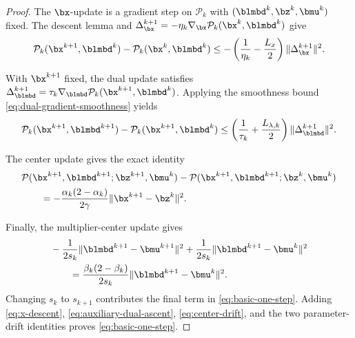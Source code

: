 \begin{proof}
The \(\bx\)-update is a gradient step on \(\mathcal P_k\) with
\((\blmbd^k,\bz^k,\bmu^k)\) fixed.  The descent lemma and
\(\Delta_{\bx}^{k+1}=-\eta_k\nabla_{\bx}\mathcal P_k(\bx^k,\blmbd^k)\)
give
\begin{equation}
    \mathcal P_k(\bx^{k+1},\blmbd^k)
    -\mathcal P_k(\bx^k,\blmbd^k)
    \le
    -\left(\frac{1}{\eta_k}-\frac{L_x}{2}\right)
    \|\Delta_{\bx}^{k+1}\|^2.
    \label{eq:x-descent}
\end{equation}

With \(\bx^{k+1}\) fixed, the dual update satisfies
\(\Delta_{\blmbd}^{k+1}=\tau_k
\nabla_{\blmbd}\mathcal P_k(\bx^{k+1},\blmbd^k)\).  Applying the smoothness
bound \eqref{eq:dual-gradient-smoothness} yields
\begin{equation}
    \mathcal P_k(\bx^{k+1},\blmbd^{k+1})
    -\mathcal P_k(\bx^{k+1},\blmbd^k)
    \le
    \left(\frac{1}{\tau_k}+\frac{L_{\lambda,k}}{2}\right)
    \|\Delta_{\blmbd}^{k+1}\|^2.
    \label{eq:auxiliary-dual-ascent}
\end{equation}

The center update gives the exact identity
\begin{equation}
\begin{aligned}
    &\mathcal P(\bx^{k+1},\blmbd^{k+1};\bz^{k+1},\bmu^k)
    -\mathcal P(\bx^{k+1},\blmbd^{k+1};\bz^k,\bmu^k) \\
    &\qquad=
    -\frac{\alpha_k(2-\alpha_k)}{2\gamma}
    \|\bx^{k+1}-\bz^k\|^2.
\end{aligned}
\label{eq:center-drift}
\end{equation}

Finally, the multiplier-center update gives
\begin{equation}
\begin{aligned}
    &-\frac{1}{2s_k}\|\blmbd^{k+1}-\bmu^{k+1}\|^2
    +\frac{1}{2s_k}\|\blmbd^{k+1}-\bmu^k\|^2 \\
    &\qquad=
    \frac{\beta_k(2-\beta_k)}{2s_k}
    \|\blmbd^{k+1}-\bmu^k\|^2.
\end{aligned}
\label{eq:mu-drift}
\end{equation}
Changing \(s_k\) to \(s_{k+1}\) contributes the final term in
\eqref{eq:basic-one-step}.  Adding
\eqref{eq:x-descent}, \eqref{eq:auxiliary-dual-ascent},
\eqref{eq:center-drift}, and the two parameter-drift identities proves
\eqref{eq:basic-one-step}.
\end{proof}
